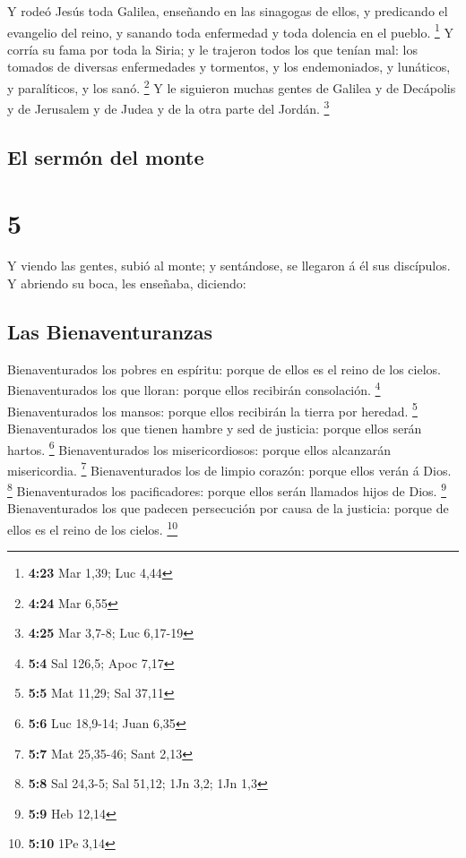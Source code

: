  Y rodeó Jesús toda Galilea, enseñando en las sinagogas
de ellos, y predicando el evangelio del reino, y sanando toda enfermedad
y toda dolencia en el pueblo. \footnote{\textbf{4:23} Mar 1,39; Luc 4,44}
 Y corría su fama por toda la Siria; y le trajeron todos
los que tenían mal: los tomados de diversas enfermedades y tormentos, y
los endemoniados, y lunáticos, y paralíticos, y los sanó. \footnote{\textbf{4:24}
  Mar 6,55}  Y le siguieron muchas gentes de Galilea y de
Decápolis y de Jerusalem y de Judea y de la otra parte del Jordán.
\footnote{\textbf{4:25} Mar 3,7-8; Luc 6,17-19}

\hypertarget{el-sermuxf3n-del-monte}{%
\subsection{El sermón del monte}\label{el-sermuxf3n-del-monte}}

\hypertarget{section-4}{%
\section{5}\label{section-4}}

 Y viendo las gentes, subió al monte; y sentándose, se
llegaron á él sus discípulos.  Y abriendo su boca, les
enseñaba, diciendo:

\hypertarget{las-bienaventuranzas}{%
\subsection{Las Bienaventuranzas}\label{las-bienaventuranzas}}

 Bienaventurados los pobres en espíritu: porque de ellos
es el reino de los cielos.  Bienaventurados los que
lloran: porque ellos recibirán consolación. \footnote{\textbf{5:4} Sal
  126,5; Apoc 7,17}  Bienaventurados los mansos: porque
ellos recibirán la tierra por heredad. \footnote{\textbf{5:5} Mat 11,29;
  Sal 37,11}  Bienaventurados los que tienen hambre y sed
de justicia: porque ellos serán hartos. \footnote{\textbf{5:6} Luc
  18,9-14; Juan 6,35}  Bienaventurados los
misericordiosos: porque ellos alcanzarán misericordia. \footnote{\textbf{5:7}
  Mat 25,35-46; Sant 2,13}  Bienaventurados los de limpio
corazón: porque ellos verán á Dios. \footnote{\textbf{5:8} Sal 24,3-5;
  Sal 51,12; 1Jn 3,2; 1Jn 1,3}  Bienaventurados los
pacificadores: porque ellos serán llamados hijos de Dios. \footnote{\textbf{5:9}
  Heb 12,14}  Bienaventurados los que padecen persecución
por causa de la justicia: porque de ellos es el reino de los cielos.
\footnote{\textbf{5:10} 1Pe 3,14}

